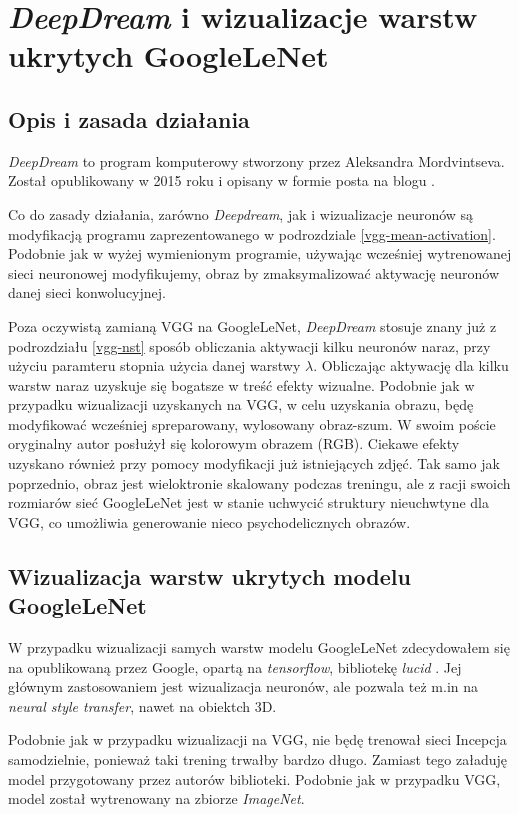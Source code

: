 \section{\textit{DeepDream} i wizualizacje warstw ukrytych GoogleLeNet}

\subsection{Opis i zasada działania}
\label{ddopis}
\textit{DeepDream} to  program komputerowy stworzony przez Aleksandra Mordvintseva. Został opublikowany  w 2015 roku i opisany w formie posta na blogu \cite{deepdream}.

Co do zasady działania, zarówno \textit{Deepdream}, jak i wizualizacje neuronów są modyfikacją programu zaprezentowanego w podrozdziale \ref{vgg-mean-activation}. Podobnie jak w wyżej wymienionym programie, używając wcześniej wytrenowanej sieci neuronowej modyfikujemy, obraz by zmaksymalizować aktywację neuronów danej sieci konwolucyjnej.

Poza oczywistą zamianą VGG na GoogleLeNet, \textit{DeepDream} stosuje znany już z podrozdziału
\ref{vgg-nst} sposób obliczania aktywacji kilku neuronów naraz, przy użyciu paramteru stopnia 
użycia danej warstwy \(\lambda\). Obliczając aktywację dla kilku warstw naraz uzyskuje się bogatsze w treść efekty wizualne. Podobnie jak w przypadku wizualizacji uzyskanych na VGG, w celu uzyskania obrazu, będę
modyfikować wcześniej spreparowany, wylosowany obraz-szum. W swoim poście oryginalny autor posłużył się kolorowym obrazem (RGB). Ciekawe efekty uzyskano również przy pomocy modyfikacji już istniejących zdjęć. Tak samo jak poprzednio, obraz jest wieloktronie skalowany podczas treningu, ale z racji swoich rozmiarów sieć GoogleLeNet jest w stanie uchwycić struktury nieuchwtyne dla VGG, co umożliwia generowanie 
nieco psychodelicznych obrazów.

\subsection{Wizualizacja warstw ukrytych modelu GoogleLeNet}
W przypadku wizualizacji samych warstw modelu GoogleLeNet zdecydowałem się na  
opublikowaną przez Google, opartą na \textit{tensorflow}, bibliotekę \textit{lucid} \cite{lucidrepo}. Jej głównym zastosowaniem jest wizualizacja neuronów, ale pozwala też m.in na \textit{neural style transfer}, nawet na obiektch 3D.

Podobnie jak w przypadku wizualizacji na VGG, nie będę trenował sieci Incepcja samodzielnie, ponieważ taki trening trwałby bardzo długo. Zamiast tego załaduję model przygotowany przez autorów biblioteki. Podobnie jak w przypadku VGG, model został wytrenowany na zbiorze \textit{ImageNet}.

